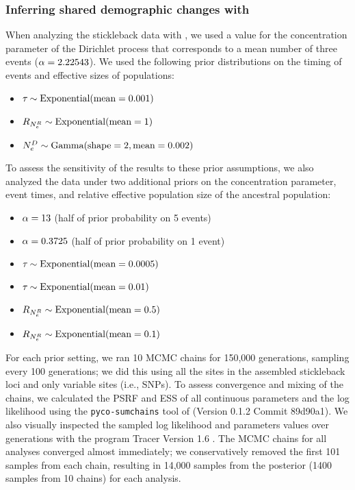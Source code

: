 \subsubsection{Inferring shared demographic changes with \ecoevolity}

When analyzing the stickleback data with \ecoevolity, we used a value for the
concentration parameter of the Dirichlet process that corresponds to a mean
number of three events
($\concentration = 2.22543$).
We used the following prior distributions on the timing of events and effective
sizes of populations:
\begin{itemize}
    \item $\etime \sim \dexponential{0.001}$
    \item $\rootrelativepopsize \sim \dexponential{1}$
    \item $\epopsize[\descendantpopindex{}] \sim \dgamma{2}{0.002}$
\end{itemize}
To assess the sensitivity of the results to these prior assumptions,
we also analyzed the data under two additional priors on
the concentration parameter, event times, and relative
effective population size of the ancestral population:
\begin{itemize}
    \item $\concentration = 13$ (half of prior probability on 5 events)
    \item $\concentration = 0.3725$ (half of prior probability on 1 event)
    \item $\etime \sim \dexponential{0.0005}$
    \item $\etime \sim \dexponential{0.01}$
    \item $\rootrelativepopsize \sim \dexponential{0.5}$
    \item $\rootrelativepopsize \sim \dexponential{0.1}$
\end{itemize}

For each prior setting, we ran 10 MCMC chains for 150,000 generations, sampling
every 100 generations; we did this using all the sites in the assembled
stickleback loci and only variable sites (i.e., SNPs).
To assess convergence and mixing of the chains, we calculated the PSRF
\citep{Brooks1998}
and ESS \citep{Gong2014} of all continuous parameters and the log likelihood
using the \texttt{pyco-sumchains} tool of \pycoevolity (Version 0.1.2 Commit
89d90a1).
We also visually inspected the sampled log likelihood and parameters values
over generations with the program Tracer Version 1.6 \citep{Tracer16}.
The MCMC chains for all analyses converged almost immediately; we
conservatively removed the first 101 samples from each chain, resulting in
14,000 samples from the posterior (1400 samples from 10 chains) for each
analysis.

